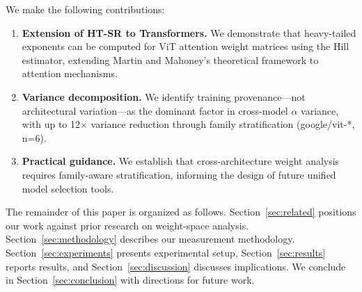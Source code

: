 We make the following contributions:

\begin{enumerate}
    \item \textbf{Extension of HT-SR to Transformers.} We demonstrate that heavy-tailed exponents can be computed for ViT attention weight matrices using the Hill estimator, extending Martin and Mahoney's theoretical framework to attention mechanisms.

    \item \textbf{Variance decomposition.} We identify training provenance---not architectural variation---as the dominant factor in cross-model $\alpha$ variance, with up to 12$\times$ variance reduction through family stratification (google/vit-*, n=6).

    \item \textbf{Practical guidance.} We establish that cross-architecture weight analysis requires family-aware stratification, informing the design of future unified model selection tools.
\end{enumerate}

The remainder of this paper is organized as follows. Section~\ref{sec:related} positions our work against prior research on weight-space analysis. Section~\ref{sec:methodology} describes our measurement methodology. Section~\ref{sec:experiments} presents experimental setup, Section~\ref{sec:results} reports results, and Section~\ref{sec:discussion} discusses implications. We conclude in Section~\ref{sec:conclusion} with directions for future work.
